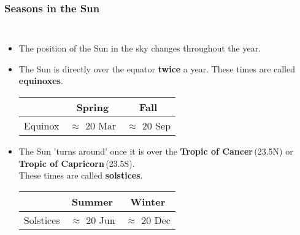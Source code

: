 \begin{frame}
\frametitle{Seasons in the Sun}
\begin{columns}
\begin{itemize}\small
	\item The position of the Sun in the sky changes throughout the year.


	\item The Sun is directly over the equator \textbf{twice} a year. These times are called \textbf{equinoxes}.
	\begin{center}\scriptsize
		\begin{tabular}{ccc}
			& Spring           & Fall             \\
			\toprule
			Equinox & $\approx$ 20 Mar & $\approx$ 20 Sep
		\end{tabular}
	\end{center}

	\item The Sun 'turns around' once it is over the \textbf{Tropic of Cancer}\,(23.5\degree N) or \textbf{Tropic of Capricorn}\,(23.5\degree S).\\ These times are called \textbf{solstices}.
	\begin{center}\scriptsize
		\begin{tabular}{ccc}
			& Summer           & Winter             \\
			\toprule
			Solstices & $\approx$ 20 Jun & $\approx$ 20 Dec
		\end{tabular}
	\end{center}
\end{itemize}
\end{columns}
\end{frame}

